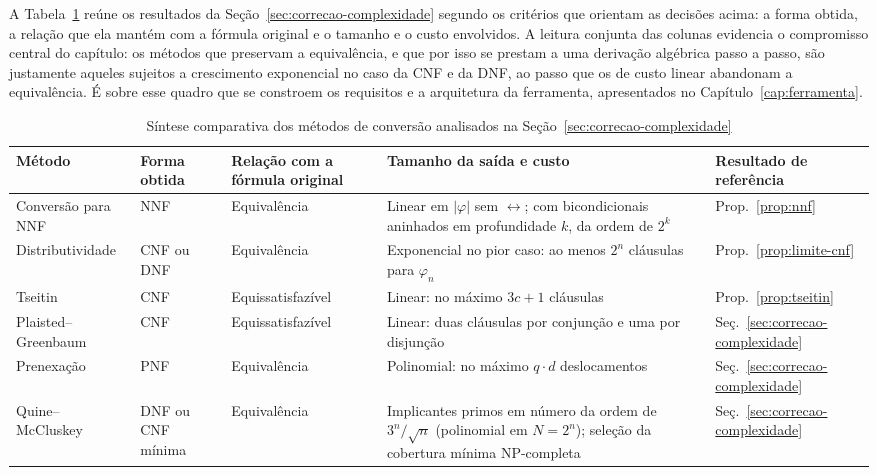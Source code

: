 \documentclass[12pt,a4paper,oneside]{report}
\theoremstyle{tituloplain}
\theoremstyle{titulodef}
\begin{document}
A Tabela~\ref{tab:comparacao-metodos} reúne os resultados da Seção~\ref{sec:correcao-complexidade} segundo os critérios que orientam as decisões acima: a forma obtida, a relação que ela mantém com a fórmula original e o tamanho e o custo envolvidos. A leitura conjunta das colunas evidencia o compromisso central do capítulo: os métodos que preservam a equivalência, e que por isso se prestam a uma derivação algébrica passo a passo, são justamente aqueles sujeitos a crescimento exponencial no caso da CNF e da DNF, ao passo que os de custo linear abandonam a equivalência. É sobre esse quadro que se constroem os requisitos e a arquitetura da ferramenta, apresentados no Capítulo~\ref{cap:ferramenta}.

\begin{table}[htbp]
\centering
\small
\caption{Síntese comparativa dos métodos de conversão analisados na Seção~\ref{sec:correcao-complexidade}}
\label{tab:comparacao-metodos}
\begin{tabular}{@{}p{2.7cm}p{1.7cm}p{2.9cm}p{3.7cm}p{1.8cm}@{}}
\toprule
\textbf{Método} & \textbf{Forma obtida} & \textbf{Relação com a fórmula original} & \textbf{Tamanho da saída e custo} & \textbf{Resultado de referência} \\
\midrule
Conversão para NNF & NNF & Equivalência & Linear em $|\varphi|$ sem $\leftrightarrow$; com bicondicionais aninhados em profundidade $k$, da ordem de $2^k$ & Prop.~\ref{prop:nnf} \\
\addlinespace
Distributividade & CNF ou DNF & Equivalência & Exponencial no pior caso: ao menos $2^n$ cláusulas para $\varphi_n$ & Prop.~\ref{prop:limite-cnf} \\
\addlinespace
Tseitin & CNF & Equissatisfazível & Linear: no máximo $3c+1$ cláusulas & Prop.~\ref{prop:tseitin} \\
\addlinespace
Plaisted--Greenbaum & CNF & Equissatisfazível & Linear: duas cláusulas por conjunção e uma por disjunção & Seç.~\ref{sec:correcao-complexidade} \\
\addlinespace
Prenexação & PNF & Equivalência & Polinomial: no máximo $q\cdot d$ deslocamentos & Seç.~\ref{sec:correcao-complexidade} \\
\addlinespace
Quine--McCluskey & DNF ou CNF mínima & Equivalência & Implicantes primos em número da ordem de $3^n/\sqrt{n}$ (polinomial em $N=2^n$); seleção da cobertura mínima NP-completa & Seç.~\ref{sec:correcao-complexidade} \\
\bottomrule
\end{tabular}
\end{table}
\end{document}
